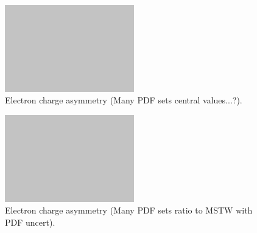 \begin{figure}[htb]
  \centering
  \includegraphics[width=0.5\textwidth]{placeholder}
  \caption{Electron charge asymmetry (Many PDF sets central values...?).}
  \label{wbos:asym_pdf}
\end{figure}

\begin{figure}[htb]
  \centering
  \includegraphics[width=0.5\textwidth]{placeholder}
  \caption{Electron charge asymmetry (Many PDF sets ratio to MSTW with PDF
  uncert).}
  \label{wbos:asym_ratio}
\end{figure}






